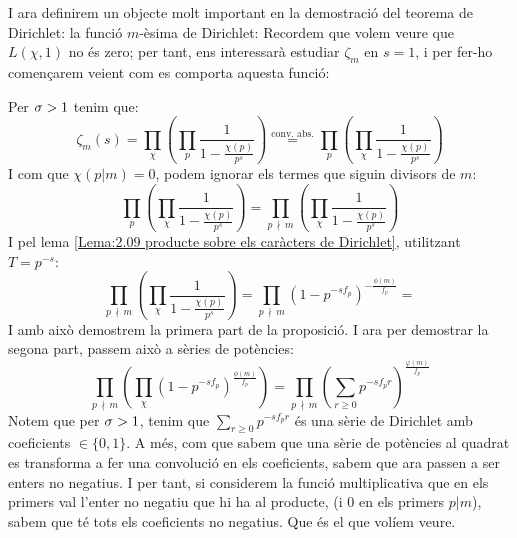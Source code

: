 I ara definirem un objecte molt important en la demostració del teorema de Dirichlet: la funció $m$-èsima de Dirichlet:
Recordem que volem veure que $L(\chi,1)$ no és zero; per tant, ens interessarà estudiar $\zeta_m$ en $s=1$, i per fer-ho començarem veient com es comporta 
aquesta funció:
\begin{pf}
    Per $\sigma>1$ tenim que:
    \[
    \zeta_m(s)=
    \prod_\chi\left(\prod_p\frac{1}{1-\frac{\chi(p)}{p^s}}\right)\overset{\text{conv. abs.}}{=}
    \prod_p\left(\prod_\chi\frac{1}{1-\frac{\chi(p)}{p^s}}\right)
    \]
    I com que $\chi(p|m)=0$, podem ignorar els termes que siguin divisors de $m$:
    \[
    \prod_p\left(\prod_\chi\frac{1}{1-\frac{\chi(p)}{p^s}}\right)=
    \prod_{p \,\nmid\, m}\left(\prod_\chi\frac{1}{1-\frac{\chi(p)}{p^s}}\right)
    \]
    I pel lema \ref{Lema:2.09 producte sobre els caràcters de Dirichlet}, utilitzant $T=p^{-s}$:
    \[
    \prod_{p \,\nmid\, m}\left(\prod_\chi\frac{1}{1-\frac{\chi(p)}{p^s}}\right)=
    \prod_{p \,\nmid\, m}\left(1-p^{-sf_p}\right)^{-\frac{\phi(m)}{f_p}}=
    \]
    I amb això demostrem la primera part de la proposició. I ara per demostrar la segona part, passem això a sèries de potències:
    \[
    \prod_{p \,\nmid\, m}\left(\prod_\chi\left(1-p^{-sf_p}\right)^{\frac{\phi(m)}{f_p}}\right)=
    \prod_{p \,\nmid\, m}\left(\sum_{r\geq0}p^{-sf_pr}\right)^{\frac{\varphi(m)}{f_p}}
    \]
    Notem que per $\sigma>1$, tenim que $\sum_{r\geq0}p^{-sf_pr}$ és una sèrie de Dirichlet amb coeficients $\in\{0,1\}$. A més, com que sabem que una sèrie de potències al quadrat es transforma a fer una convolució en els coeficients, sabem que ara passen a ser enters no negatius. I per tant, si considerem la funció multiplicativa que en els primers val l'enter no negatiu que hi ha al producte, (i 0 en els primers $p|m$), sabem que té tots els coeficients no 
    negatius. Que és el que volíem veure.
\end{pf}
